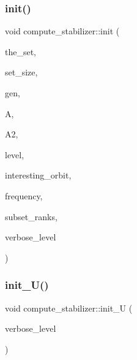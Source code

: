 \subsubsection{\texorpdfstring{init()}{init()}}
{\footnotesize\ttfamily void compute\+\_\+stabilizer\+::init (\begin{DoxyParamCaption}\item[{\mbox{\hyperlink{galois_8h_a09fddde158a3a20bd2dcadb609de11dc}{I\+NT}} $\ast$}]{the\+\_\+set,  }\item[{\mbox{\hyperlink{galois_8h_a09fddde158a3a20bd2dcadb609de11dc}{I\+NT}}}]{set\+\_\+size,  }\item[{\mbox{\hyperlink{classgenerator}{generator}} $\ast$}]{gen,  }\item[{\mbox{\hyperlink{classaction}{action}} $\ast$}]{A,  }\item[{\mbox{\hyperlink{classaction}{action}} $\ast$}]{A2,  }\item[{\mbox{\hyperlink{galois_8h_a09fddde158a3a20bd2dcadb609de11dc}{I\+NT}}}]{level,  }\item[{\mbox{\hyperlink{galois_8h_a09fddde158a3a20bd2dcadb609de11dc}{I\+NT}}}]{interesting\+\_\+orbit,  }\item[{\mbox{\hyperlink{galois_8h_a09fddde158a3a20bd2dcadb609de11dc}{I\+NT}}}]{frequency,  }\item[{\mbox{\hyperlink{galois_8h_a09fddde158a3a20bd2dcadb609de11dc}{I\+NT}} $\ast$}]{subset\+\_\+ranks,  }\item[{\mbox{\hyperlink{galois_8h_a09fddde158a3a20bd2dcadb609de11dc}{I\+NT}}}]{verbose\+\_\+level }\end{DoxyParamCaption})}

\mbox{\label{classcompute__stabilizer_a00de428b9934e9a55157eff6c43d64d0}} 
\subsubsection{\texorpdfstring{init\+\_\+\+U()}{init\_U()}}
{\footnotesize\ttfamily void compute\+\_\+stabilizer\+::init\+\_\+U (\begin{DoxyParamCaption}\item[{\mbox{\hyperlink{galois_8h_a09fddde158a3a20bd2dcadb609de11dc}{I\+NT}}}]{verbose\+\_\+level }\end{DoxyParamCaption})}

